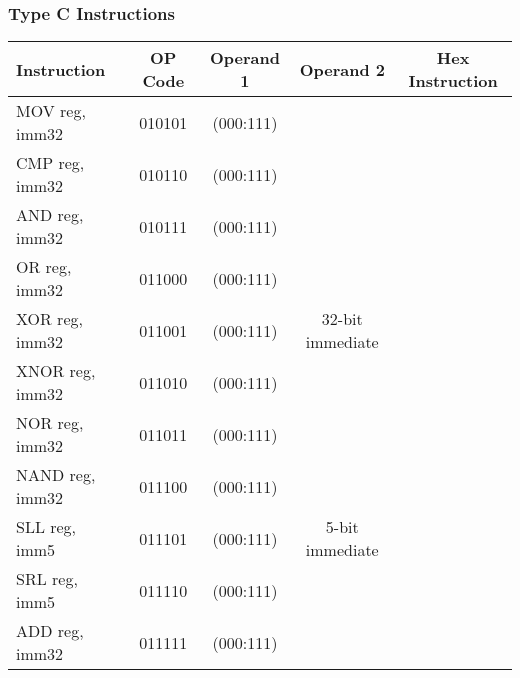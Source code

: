 \documentclass[a4paper, 11pt]{report}
\begin{document}
\subsubsection{Type C Instructions}
\begin{center}
    \begin{tabular}{|l|c|c|c|c|}
        \hline
        \textbf{Instruction} & \textbf{OP Code} & \textbf{Operand 1} & \textbf{Operand 2} & \textbf{Hex Instruction} \\
        \hline
        MOV reg, imm32       & 010101           & (000:111)          &                    &                          \\
        \cline{1-3}
        \cline{5-5}
        CMP reg, imm32       & 010110           & (000:111)          &                    &                          \\
        \cline{1-3}
        \cline{5-5}
        AND reg, imm32       & 010111           & (000:111)          &                    &                          \\
        \cline{1-3}
        \cline{5-5}
        OR reg, imm32        & 011000           & (000:111)          &                    &                          \\
        \cline{1-3}
        \cline{5-5}
        XOR reg, imm32       & 011001           & (000:111)          & 32-bit immediate   &                          \\
        \cline{1-3}
        \cline{5-5}
        XNOR reg, imm32      & 011010           & (000:111)          &                    &                          \\
        \cline{1-3}
        \cline{5-5}
        NOR reg, imm32       & 011011           & (000:111)          &                    &                          \\
        \cline{1-3}
        \cline{5-5}
        NAND reg, imm32      & 011100           & (000:111)          &                    &                          \\
        \hline
        SLL reg, imm5        & 011101           & (000:111)          & 5-bit immediate    &                          \\
        \cline{1-3}
        \cline{5-5}
        SRL reg, imm5        & 011110           & (000:111)          &                    &                          \\
        \hline
        ADD reg, imm32       & 011111           & (000:111)          &                    &                          \\

\end{tabular}
\end{center}
\end{document}
